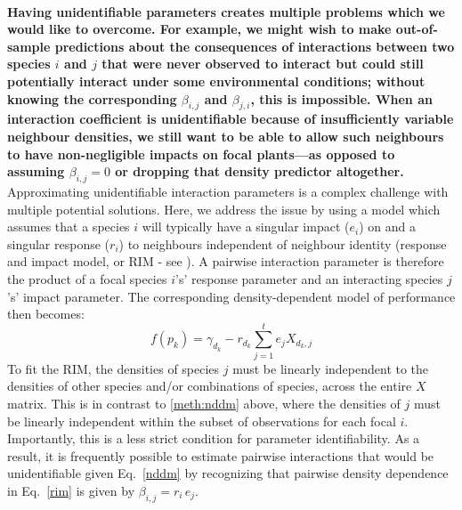 \documentclass[a4,12pt]{article}
\begin{document}
\begin{refsection}
    \paragraph{}
    {\textbf{Having unidentifiable parameters creates multiple problems which we would like to overcome. For example, we might wish to make out-of-sample predictions about the consequences of interactions between two species $i$ and $j$ that were never observed to interact but could still potentially interact under some environmental conditions; without knowing the corresponding $\beta_{i,j}$ and $\beta_{j,i}$, this is impossible. When an interaction coefficient is unidentifiable because of insufficiently variable neighbour densities, we still want to be able to allow such neighbours to have non-negligible impacts on focal plants---as opposed to assuming $\beta_{i,j} = 0$ or dropping that density predictor altogether.}}
    Approximating unidentifiable interaction parameters is a complex challenge with multiple potential solutions. Here, we address the issue by using a model which assumes that a species $i$ will typically have a singular impact ($e_i$) on and a singular response ($r_i$) to neighbours independent of neighbour identity (response and impact model, or RIM - see \cite{Godoy2014b}). A pairwise interaction parameter is therefore the product of a focal species $i$'s' response parameter and an interacting species $j$'s' impact parameter. The corresponding density-dependent model of performance then becomes:
        \begin{equation}
        f(p_{k}) = \gamma_{d_k} - r_{d_k} \sum_{j=1}^{t} e_{j} X_{d_k, j}
        \label{rim}
        \end{equation}
    To fit the RIM, the densities of species $j$ must be linearly independent to the densities of other species and/or combinations of species, across the entire $X$ matrix. This is in contrast to \ref{meth:nddm} above, where the densities of $j$ must be linearly independent within the subset of observations for each focal $i$. Importantly, this is a less strict condition for parameter identifiability. As a result, it is frequently possible to estimate pairwise interactions that would be unidentifiable given Eq.~\ref{nddm} by recognizing that pairwise density dependence in Eq.~\ref{rim} is given by $\beta_{i, j} = r_{i} \, e_{j}$.


\end{refsection}
\end{document}
